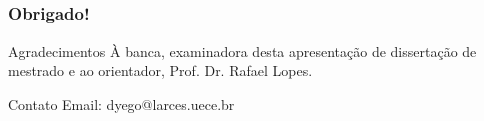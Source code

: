 \documentclass[aspectratio=169]{beamer}
\begin{document}

\subsection{}
\begin{frame}
\frametitle{Obrigado!}

\begin{block}{Agradecimentos}\small
À banca, examinadora desta apresentação de dissertação de mestrado e ao orientador, Prof. Dr. Rafael Lopes.


\end{block}

\begin{block}{Contato}\small
Email: dyego@larces.uece.br
\end{block}

\end{frame}
\end{document}
